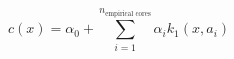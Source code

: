 \documentclass[preview]{standalone}
\begin{document}
\[
    c(x)=\alpha_0+\sum_{i=1}^{n_\text{empirical cores}}\alpha_ik_1(x,a_i)
\]
\end{document}
